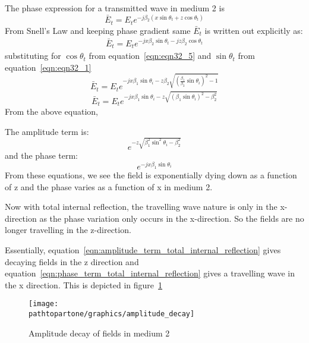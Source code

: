 \begin{enumerate}[(i)]
The phase expression for a transmitted wave in medium 2 is
\begin{equation*}
\bar{E}_t = E_{t}e^{-j \beta_2(x\sin\theta_t + z\cos\theta_t)}
\end{equation*}
From Snell's Law and keeping phase gradient same $\bar{E}_t$ is written out explicitly as:
\begin{align}
\bar{E}_t = E_te^{- j x\beta_2\sin\theta_t - j z\beta_2\cos\theta_t}
\end{align}
substituting for $\cos\theta_t$ from equation~\ref{eqn:eqn32_5}
and $\sin\theta_t$ from equation~\ref{eqn:eqn32_1}
\begin{equation*}
\bar{E}_t = E_te^{- {j x\beta_1\sin\theta_i}  -  z \beta_2\sqrt{{(\frac{\beta_1}{\beta_2}\sin\theta_i)}^2 - 1}}
\end{equation*}
\begin{equation}
\bar{E}_t = E_te^{- {j x\beta_1\sin\theta_i}  -  z \sqrt{{(\beta_1\sin\theta_i)}^2 - \beta_{2}^{2}}}
\end{equation}
From the above equation,

The amplitude term is:
\begin{equation}
e^{-z\sqrt{\beta_1^2\sin^2\theta_i - \beta_2^{2}}}
\label{eqn:amplitude_term_total_internal_reflection}
\end{equation}
and the phase term:
\begin{equation}
e^{- j x\beta_1\sin\theta_i}
\label{eqn:phase_term_total_internal_reflection}
\end{equation}
From these equations, we see the field is exponentially dying down as a function of z and the phase varies as a function of x in medium 2.
\end{enumerate}
Now with total internal reflection, the travelling wave nature is only in the x-direction as the phase variation only occurs in the x-direction. So the fields are no longer travelling in the z-direction.

Essentially, equation~\ref{eqn:amplitude_term_total_internal_reflection} gives decaying fields in the z direction and equation~\ref{eqn:phase_term_total_internal_reflection}  gives a travelling wave in the x direction. This is depicted in figure~\ref{fig:amplitude_decay_total_internal_reflection}
\begin{figure}[h]
\centering
\texttt{[image: \\pathtopartone/graphics/amplitude\_decay]}
\caption{Amplitude decay of fields in medium 2}
\label{fig:amplitude_decay_total_internal_reflection}
\end{figure}

